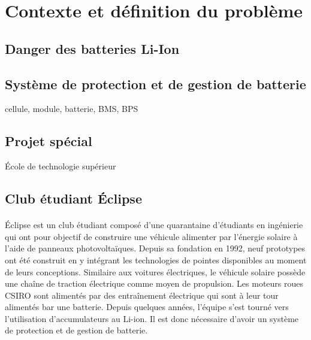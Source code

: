 \section{Contexte et définition du problème}


\subsection{Danger des batteries Li-Ion}

\subsection{Système de protection et de gestion de batterie}

cellule, module, batterie, BMS, BPS

\subsection{Projet spécial}

École de technologie supérieur

\subsection{Club étudiant Éclipse}

\paragraph{}
Éclipse est un club étudiant composé d'une quarantaine d'étudiants en ingénierie qui ont pour objectif de construire une véhicule alimenter par l'énergie solaire à l'aide de panneaux photovoltaïques. Depuis sa fondation en 1992, neuf prototypes ont été construit en y intégrant les technologies de pointes disponibles au moment de leurs conceptions. Similaire aux voitures électriques, le véhicule solaire possède une chaîne de traction électrique comme moyen de propulsion. Les moteurs roues  CSIRO sont alimentés par des entraînement électrique qui sont à leur tour alimentés bar une batterie. Depuis quelques années, l'équipe s'est tourné vers l'utilisation d'accumulateurs au Li-ion. Il est donc nécessaire d'avoir un système de protection et de gestion de batterie.

